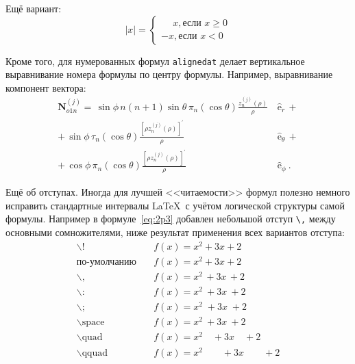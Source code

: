 Ещё вариант:
\[
    |x|=
    \begin{cases}
        \phantom{-}x, \text{если } x \geqslant 0 \\
        -x, \text{если } x<0
    \end{cases}
\]

Кроме того, для  нумерованных формул \verb|alignedat| делает вертикальное
выравнивание номера формулы по центру формулы. Например, выравнивание
компонент вектора:
\begin{equation}
    \label{eq:2p3}
    \begin{alignedat}{2}
        {\mathbf{N}}_{o1n}^{(j)} = \,{\sin} \phi\,n\!\left(n+1\right)
        {\sin}\theta\,
        \pi_n\!\left({\cos} \theta\right)
        \frac{
        z_n^{(j)}\!\left( \rho \right)
        }{\rho}\,
         & {\boldsymbol{\hat{\mathrm e}}}_{r}\,+      \\
        +\,
        {\sin} \phi\,
        \tau_n\!\left({\cos} \theta\right)
        \frac{
        \left[\rho z_n^{(j)}\!\left( \rho \right)\right]^{\prime}
        }{\rho}\,
         & {\boldsymbol{\hat{\mathrm e}}}_{\theta}\,+ \\
        +\,
        {\cos} \phi\,
        \pi_n\!\left({\cos} \theta\right)
        \frac{
        \left[\rho z_n^{(j)}\!\left( \rho \right)\right]^{\prime}
        }{\rho}\,
         & {\boldsymbol{\hat{\mathrm e}}}_{\phi}\:.
    \end{alignedat}
\end{equation}

Ещё об отступах. Иногда для лучшей <<читаемости>> формул полезно
немного исправить стандартные интервалы \LaTeX\ с учётом логической
структуры самой формулы. Например в формуле~\cref{eq:2p3} добавлен
небольшой отступ \verb+\,+ между основными сомножителями, ниже
результат применения всех вариантов отступа:
\begin{align*}
    \backslash!             & \quad f(x) = x^2\! +3x\! +2         \\
    \mbox{по-умолчанию}     & \quad f(x) = x^2+3x+2               \\
    \backslash,             & \quad f(x) = x^2\, +3x\, +2         \\
    \backslash{:}           & \quad f(x) = x^2\: +3x\: +2         \\
    \backslash;             & \quad f(x) = x^2\; +3x\; +2         \\
    \backslash \mbox{space} & \quad f(x) = x^2\ +3x\ +2           \\
    \backslash \mbox{quad}  & \quad f(x) = x^2\quad +3x\quad +2   \\
    \backslash \mbox{qquad} & \quad f(x) = x^2\qquad +3x\qquad +2
\end{align*}

